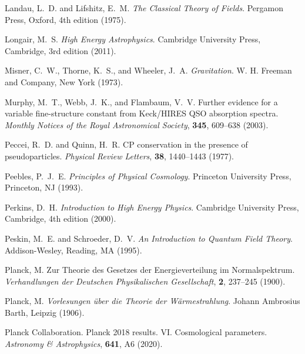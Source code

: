 \documentclass[12pt,a4paper]{article}
\begin{document}
\begin{thebibliography}{99}
		Landau, L.~D. and Lifshitz, E.~M.
		\newblock \textit{The Classical Theory of Fields}.
		\newblock Pergamon Press, Oxford, 4th edition (1975).
		
		Longair, M.~S.
		\newblock \textit{High Energy Astrophysics}.
		\newblock Cambridge University Press, Cambridge, 3rd edition (2011).
		
		Misner, C.~W., Thorne, K.~S., and Wheeler, J.~A.
		\newblock \textit{Gravitation}.
		\newblock W. H. Freeman and Company, New York (1973).
		
		Murphy, M.~T., Webb, J.~K., and Flambaum, V.~V.
		\newblock Further evidence for a variable fine-structure constant from Keck/HIRES QSO absorption spectra.
		\newblock \textit{Monthly Notices of the Royal Astronomical Society}, \textbf{345}, 609--638 (2003).
		\newblock {}
		
		Peccei, R.~D. and Quinn, H.~R.
		\newblock CP conservation in the presence of pseudoparticles.
		\newblock \textit{Physical Review Letters}, \textbf{38}, 1440--1443 (1977).
		\newblock {}
		
		Peebles, P.~J.~E.
		\newblock \textit{Principles of Physical Cosmology}.
		\newblock Princeton University Press, Princeton, NJ (1993).
		
		Perkins, D.~H.
		\newblock \textit{Introduction to High Energy Physics}.
		\newblock Cambridge University Press, Cambridge, 4th edition (2000).
		
		Peskin, M.~E. and Schroeder, D.~V.
		\newblock \textit{An Introduction to Quantum Field Theory}.
		\newblock Addison-Wesley, Reading, MA (1995).
		
		Planck, M.
		\newblock Zur Theorie des Gesetzes der Energieverteilung im Normalspektrum.
		\newblock \textit{Verhandlungen der Deutschen Physikalischen Gesellschaft}, \textbf{2}, 237--245 (1900).
		
		Planck, M.
		\newblock \textit{Vorlesungen über die Theorie der Wärmestrahlung}.
		\newblock Johann Ambrosius Barth, Leipzig (1906).
		
		Planck Collaboration.
		\newblock Planck 2018 results. VI. Cosmological parameters.
		\newblock \textit{Astronomy \& Astrophysics}, \textbf{641}, A6 (2020).
		\newblock {}
		

\end{thebibliography}
\end{document}

